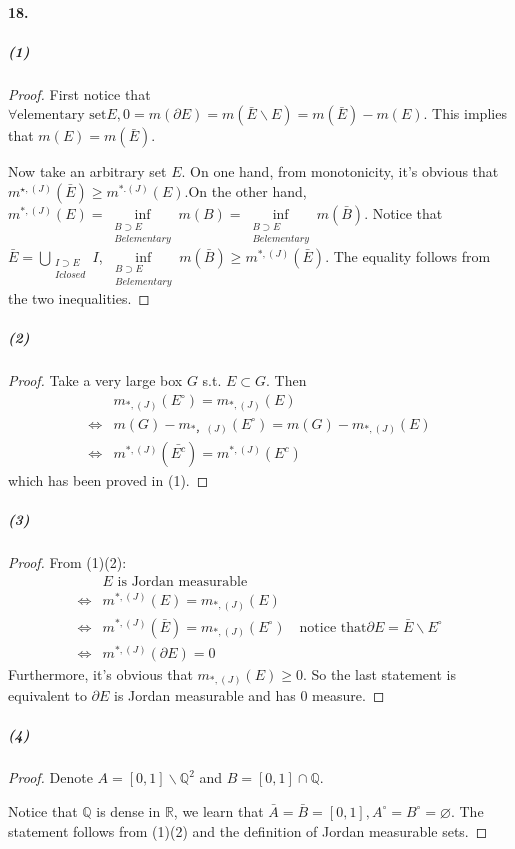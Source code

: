 \documentclass{article}
\begin{document}
\paragraph{18.}
\subparagraph{(1)}
\begin{proof}
First notice that $\forall \text{elementary set} E, 0=m(\partial E)=m(\bar{E}\backslash E)=m(\bar{E})-m(E)$. This implies that $m(E)=m(\bar{E})$.

Now take an arbitrary set $E$. On one hand, from monotonicity, it's obvious that $m^{\star,(J)}(\bar{E})\geq m^{*.(J)}(E)$.On the other hand, $m^{*,(J)}(E)=\inf\limits_{\substack{B\supset E\\B elementary}}m(B)=\inf\limits_{\substack{B\supset E\\B elementary}}m(\bar{B})$. Notice that $\bar{E}=\bigcup\limits_{\substack{I\supset E\\I closed}}I$, $\inf\limits_{\substack{B\supset E\\B elementary}}m(\bar{B})\geq m^{*,(J)}(\bar{E})$. The equality follows from the two inequalities.
\end{proof}
\subparagraph{(2)}
\begin{proof}
Take a very large box $G$ s.t. $E\subset G$. Then
\begin{align*}
&m_{*,(J)}(E^\circ)=m_{*,(J)}(E)\\
\Leftrightarrow&m(G)-m_{*，(J)}(E^\circ)=m(G)-m_{*,(J)}(E)\\
\Leftrightarrow&m^{*,(J)}(\bar{E^c})=m^{*,(J)}(E^c)
\end{align*}
which has been proved in (1).
\end{proof}
\subparagraph{(3)}
\begin{proof}
From (1)(2):
\begin{align*}
&E\text{ is Jordan measurable}\\
\Leftrightarrow &m^{*,(J)}(E)=m_{*,(J)}(E)\\
\Leftrightarrow &m^{*,(J)}(\bar{E})=m_{*,(J)}(E^\circ) \quad \text{notice that} \partial E=\bar{E}\backslash E^\circ\\
\Leftrightarrow &m^{*,(J)}(\partial E)=0
\end{align*}
Furthermore, it's obvious that $m_{*,(J)}(E)\geq 0$. So the last statement is equivalent to $\partial E$ is Jordan measurable and has 0 measure.
\end{proof}
\subparagraph{(4)}
\begin{proof}
Denote $A=[0,1]\backslash \mathbb{Q}^2$ and $B=[0,1]\cap \mathbb{Q}$.

Notice that $\mathbb{Q}$ is dense in $\mathbb{R}$, we learn that $\bar{A}=\bar{B}=[0,1],A^\circ=B^\circ=\varnothing$. The statement follows from (1)(2) and the definition of Jordan measurable sets.
\end{proof}
\end{document}
